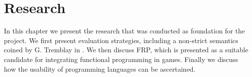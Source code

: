 \chapter{Research}
In this chapter we present the research that was conducted as foundation for the project. We first present evaluation strategies, including a non-strict semantics coined  by G. Tremblay in \cite{DBLP:journals/cl/Tremblay-lenient}. We then discuss \gls{FRP}, which is presented as a suitable candidate for integrating functional programming in games\cite{maraffi:frp,courtney2003yampa,cheong2005functional}. Finally we discuss how the usability of programming languages can be ascertained.




